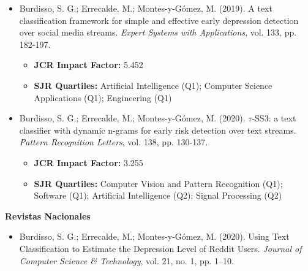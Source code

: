 \begin{itemize}
    \item Burdisso, S. G.; Errecalde, M.; Montes-y-Gómez, M. (2019). A text classification framework for simple and effective early depression detection over social media streams. \emph{Expert Systems with Applications}, vol. 133, pp. 182-197. %
    \begin{itemize}
        \item \textbf{JCR Impact Factor:} 5.452
        \item \textbf{SJR Quartiles:} Artificial Intelligence (Q1); Computer Science Applications (Q1); Engineering (Q1)
    \end{itemize}
    \item Burdisso, S. G.; Errecalde, M.; Montes-y-Gómez, M. (2020). $\tau$-SS3: a text classifier with dynamic n-grams for early risk detection over text streams. \emph{Pattern Recognition Letters}, vol. 138, pp. 130-137. %
    \begin{itemize}
        \item \textbf{JCR Impact Factor:} 3.255
        \item \textbf{SJR Quartiles:} Computer Vision and Pattern Recognition (Q1); Software (Q1); Artificial Intelligence (Q2); Signal Processing (Q2)
    \end{itemize}
\end{itemize}

\noindent
\textbf{Revistas Nacionales}

\begin{itemize}
    \item Burdisso, S. G.; Errecalde, M.; Montes-y-Gómez, M. (2020). Using Text Classification to Estimate the Depression Level of Reddit Users. \emph{Journal of Computer Science \& Technology}, vol. 21, no. 1, pp. 1–10. %
\end{itemize}

